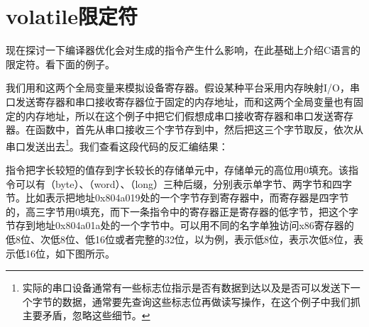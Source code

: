 


\section{volatile限定符}
%
现在探讨一下编译器优化会对生成的指令产生什么影响，在此基础上介绍C语言的限定符。看下面的例子。





我们用和这两个全局变量来模拟设备寄存器。假设某种平台采用内存映射I/\BookSplit{}O，串口发送寄存器和串口接收寄存器位于固定的内存地址，而和这两个全局变量也有固定的内存地址，所以在这个例子中把它们假想成串口接收寄存器和串口发送寄存器。在函数中，首先从串口接收三个字节存到中，然后把这三个字节取反，依次从串口发送出去\footnote[31]{实际的串口设备通常有一些标志位指示是否有数据到达以及是否可以发送下一个字节的数据，通常要先查询这些标志位再做读写操作，在这个例子中我们抓主要矛盾，忽略这些细节。}。我们查看这段代码的反汇编结果：




指令把字长较短的值存到字长较长的存储单元中，存储单元的高位用0填充。该指令可以有（byte）、（word）、（long）三种后缀，分别表示单字节、两字节和四字节。比如表示把地址0x804a019处的一个字节存到寄存器中，而寄存器是四字节的，高三字节用0填充，而下一条指令中的寄存器正是寄存器的低字节，把这个字节存到地址0x804a01a处的一个字节中。可以用不同的名字单独访问x86寄存器的低8位、次低8位、低16位或者完整的32位，以为例，表示低8位，表示次低8位，表示低16位，如下图所示。




